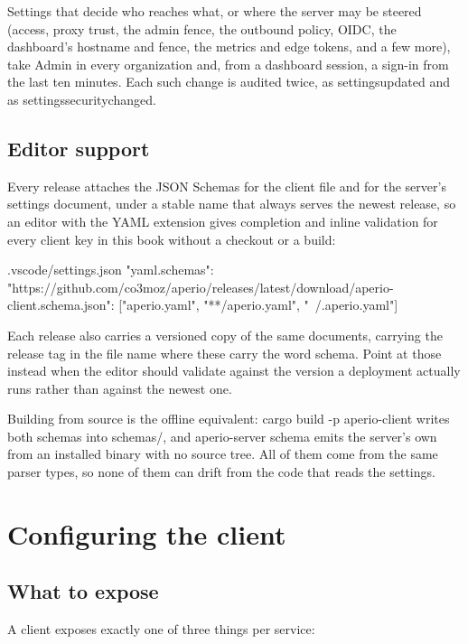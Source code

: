 \documentclass[11pt,a4paper,oneside]{book}
\newcommand{\aperiobreakableunderscore}{\textunderscore\allowbreak}
\newcommand{\aperiocodebreaks}{\XeTeXinterchartokenstate=1 }
\newcommand{\aperiocodebreaks}{}
\DeclareRobustCommand{\code}[1]{{\ttfamily\small\aperiocodebreaks
  \let\_\aperiobreakableunderscore#1}}
\begin{document}
Settings that decide who reaches what, or where the server may be steered
(access, proxy trust, the admin fence, the outbound policy, OIDC, the
dashboard's hostname and fence, the metrics and edge tokens, and a few more),
take Admin in every organization and, from a dashboard session, a sign-in from
the last ten minutes. Each such change is audited twice, as
\code{settings\_updated} and as \code{settings\_security\_changed}.

\section{Editor support}

Every release attaches the JSON Schemas for the client file and for the
server's settings document, under a stable name that always serves the newest
release, so an editor with the YAML extension gives completion and inline
validation for every client key in this book without a checkout or a build:

\begin{codecard}[aperiojson]{.vscode/settings.json}
{
  "yaml.schemas": {
    "https://github.com/co3moz/aperio/releases/latest/download/aperio-client.schema.json":
      ["aperio.yaml", "**/aperio.yaml", "~/.aperio.yaml"]
  }
}
\end{codecard}

Each release also carries a versioned copy of the same documents, carrying the
release tag in the file name where these carry the word \code{schema}. Point
at those instead when the editor should validate against the version a
deployment actually runs rather than against the newest one.

Building from source is the offline equivalent: \code{cargo build -p
aperio-client} writes both schemas into \code{schemas/}, and
\code{aperio-server schema} emits the server's own from an installed binary
with no source tree. All of them come from the same parser types, so none of
them can drift from the code that reads the settings.

\chapter{Configuring the client}
\label{ch:client-config}

\section{What to expose}

A client exposes exactly one of three things per service:
\end{document}
